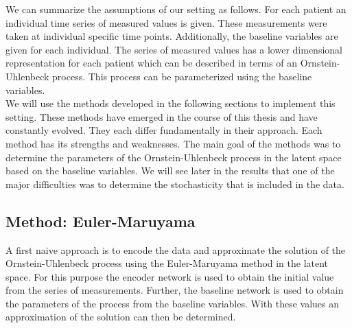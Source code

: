 \documentclass[11pt,titlepage]{article}
\theoremstyle{definition}
\theoremstyle{remark}
\begin{document}
	We can summarize the assumptions of our setting as follows. For each patient an individual time series of measured values is given. These measurements were taken at individual specific time points. Additionally, the baseline variables are given for each individual. The series of measured values has a lower dimensional representation for each patient which can be described in terms of an Ornstein-Uhlenbeck process. This process can be parameterized using the baseline variables.\\
	We will use the methods developed in the following sections to implement this setting. These methods have emerged in the course of this thesis and have constantly evolved. They each differ fundamentally in their approach. Each method has its strengths and weaknesses. The main goal of the methods was to determine the parameters of the Ornstein-Uhlenbeck process in the latent space based on the baseline variables. We will see later in the results that one of the major difficulties was to determine the stochasticity that is included in the data.
	
	\clearpage
	\subsection{Method: Euler-Maruyama}\label{sec Eul Mar}
	
	A first naive approach is to encode the data and approximate the solution of the Ornstein-Uhlenbeck process using the Euler-Maruyama method in the latent space. For this purpose the encoder network is used to obtain the initial value from the series of measurements. Further, the baseline network is used to obtain the parameters of the process from the baseline variables. With these values an approximation of the solution can then be determined.\\
	
\end{document}
